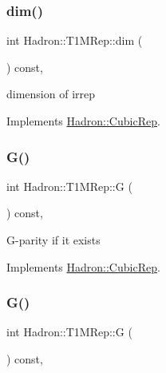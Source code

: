 \subsubsection{\texorpdfstring{dim()}{dim()}\hspace{0.1cm}{\footnotesize\ttfamily [3/3]}}
{\footnotesize\ttfamily int Hadron\+::\+T1\+M\+Rep\+::dim (\begin{DoxyParamCaption}{ }\end{DoxyParamCaption}) const\hspace{0.3cm}{\ttfamily [inline]}, {\ttfamily [virtual]}}

dimension of irrep 

Implements \mbox{\hyperlink{structHadron_1_1CubicRep_ac178d14064f037a66af4b9fb4b312d51}{Hadron\+::\+Cubic\+Rep}}.

\mbox{\label{structHadron_1_1T1MRep_ae0742a7a1d446b771a85df3c9c8d8f28}} 
\subsubsection{\texorpdfstring{G()}{G()}\hspace{0.1cm}{\footnotesize\ttfamily [1/3]}}
{\footnotesize\ttfamily int Hadron\+::\+T1\+M\+Rep\+::G (\begin{DoxyParamCaption}{ }\end{DoxyParamCaption}) const\hspace{0.3cm}{\ttfamily [inline]}, {\ttfamily [virtual]}}

G-\/parity if it exists 

Implements \mbox{\hyperlink{structHadron_1_1CubicRep_a52104e43266d1614c00bbd1c3b395458}{Hadron\+::\+Cubic\+Rep}}.

\mbox{\label{structHadron_1_1T1MRep_ae0742a7a1d446b771a85df3c9c8d8f28}} 
\subsubsection{\texorpdfstring{G()}{G()}\hspace{0.1cm}{\footnotesize\ttfamily [2/3]}}
{\footnotesize\ttfamily int Hadron\+::\+T1\+M\+Rep\+::G (\begin{DoxyParamCaption}{ }\end{DoxyParamCaption}) const\hspace{0.3cm}{\ttfamily [inline]}, {\ttfamily [virtual]}}

